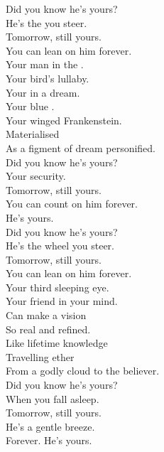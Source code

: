 
\label{album:butterfly-3000}





Did you know he's yours? \\
He's the  you steer. \\
Tomorrow, still yours. \\
You can lean on him forever. \\

Your man in the . \\
Your bird's lullaby. \\
Your  in a dream. \\
Your blue . \\
Your winged Frankenstein. \\
Materialised \\
As a figment of dream personified. \\

Did you know he's yours? \\
Your security. \\
Tomorrow, still yours. \\
You can count on him forever. \\

He's yours. \\

Did you know he's yours? \\
He's the wheel you steer. \\
Tomorrow, still yours. \\
You can lean on him forever. \\

Your third sleeping eye. \\
Your friend in your mind. \\
Can make a vision \\
So real and refined. \\
Like lifetime knowledge \\
Travelling ether \\
From a godly cloud to the believer. \\

Did you know he's yours? \\
When you fall asleep. \\
Tomorrow, still yours. \\
He's a gentle breeze. \\
Forever. He's yours. \\

